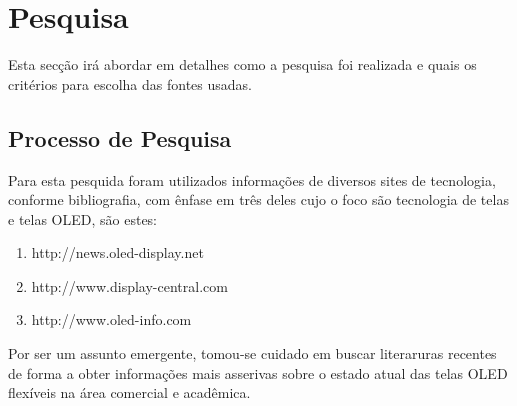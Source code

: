 \chapter{Pesquisa}
\label{cap:pesquisa}

Esta secção irá abordar em detalhes como a pesquisa foi realizada e quais os critérios para escolha das fontes usadas.


\section{Processo de Pesquisa}
\label{sec:processo de pesquisa}

Para esta pesquida foram utilizados informações de diversos sites de tecnologia, conforme bibliografia, com ênfase em três deles cujo o foco são tecnologia de telas e telas OLED, são estes: 

\begin{enumerate}
	\item http://news.oled-display.net
	\item http://www.display-central.com
	\item http://www.oled-info.com
\end{enumerate}

Por ser um assunto emergente, tomou-se cuidado em buscar literaruras recentes de forma a obter informações mais asserivas sobre o estado atual das telas OLED flexíveis na área comercial e acadêmica.